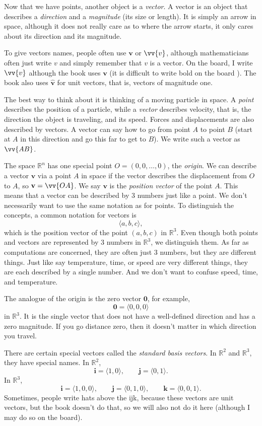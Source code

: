 \documentclass[12pt]{article}
\newcommand{\R}{{\mathbb{R}}}
\newcommand{\veci}{\mathbf{i}}
\newcommand{\vecj}{\mathbf{j}}
\newcommand{\veck}{\mathbf{k}}
\begin{document}
Now that we have points, another object is a \emph{vector}.
A vector is an object that describes a \emph{direction} and a \emph{magnitude} (its size or length).
It is simply an arrow in space,
although it does not really care as to where the arrow starts,
it only cares about its direction and its magnitude.

To give vectors names, people often use
$\mathbf{v}$ or $\vv{v}$, although mathematicians often just write $v$ and simply remember
that $v$ is a vector.
On the board, I write $\vv{v}$ although the book uses $\mathbf{v}$
(it is difficult to write bold on the board \Smiley{}).
The book also uses $\hat{\mathbf{v}}$ for unit vectors, that is,
vectors of magnitude one.

The best way to think about it is thinking of a moving particle in space.
A \emph{point} describes the position of a particle,
while a \emph{vector} describes velocity, that is, the direction the object is traveling, and its speed.
Forces and displacements are also described by vectors.
A vector can say how to go from point $A$ to point $B$
(start at $A$ in this direction and go this far to get to $B$).
We write such a vector as $\vv{AB}$.

The space $\R^n$ has one special point $O = (0,0,\ldots,0)$, the \emph{origin}.
We can describe a vector $\mathbf{v}$ via a point $A$ in space if the vector describes the
displacement from $O$ to $A$, so $\mathbf{v} = \vv{OA}$.
We say $\mathbf{v}$ is the \emph{position vector} of the point $A$.
This means that a vector can be described by 3 numbers just like a point.
We don't necessarily want to use the same notation as for points.
To distinguish the concepts,
a common notation for vectors is
\[
\langle a,b,c \rangle ,
\]
which is the position vector of the point $(a,b,c)$ in $\R^3$.
Even though both points and vectors are represented by 3 numbers in $\R^3$,
we distinguish them.
As far as computations are concerned,
they are often just 3 numbers, but they are different things.
Just like say temperature, time, or speed are very different
things, they are each described by a single number.  And we don't want to
confuse speed, time, and temperature.

The analogue of the origin is the zero vector $\mathbf{0}$, for example,
\[
\mathbf{0} = \langle 0,0,0 \rangle
\]
in $\R^3$.
It is the single vector that does not have a well-defined direction
and has a zero magnitude.
If you go distance zero, then it doesn't matter in which direction
you travel.

There are certain special vectors called the
\emph{standard basis vectors}.
In $\R^2$ and $\R^3$, they have special names.
In $\R^2$,
\[
\veci = \langle 1 , 0 \rangle, \qquad
\vecj = \langle 0 , 1 \rangle.
\]
In $\R^3$,
\[
\veci = \langle 1, 0, 0 \rangle, \qquad
\vecj = \langle 0, 1, 0 \rangle, \qquad
\veck = \langle 0, 0, 1 \rangle.
\]
Sometimes, people write hats above the ijk,
because these vectors are
unit vectors, but the book doesn't do that, so we will also not do it
here (although I may do so on the board).
\end{document}
